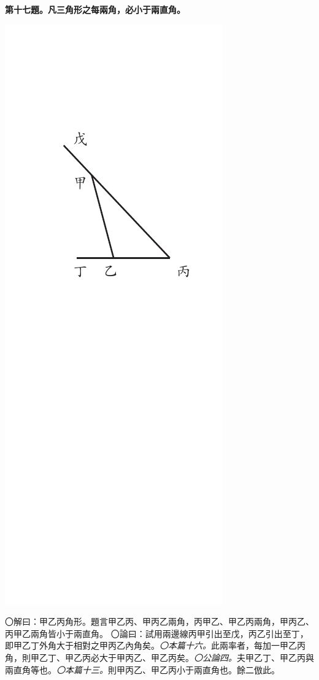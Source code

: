 \documentclass[12pt,b5paper,landscape]{article}
\newcommand{\ccom}[1]{{\footnotesize \emph{〇#1}}}
\newcommand{\bcom}[1]{〇#1}
\newcommand{\cthm}[1]{{
\vspace{8pt}

\bfseries #1}}
\begin{document}
\begin{multicols}{2}
\cthm{第十七題。凡三角形之每兩角，必小于兩直角。}
\begin{center}
  \includegraphics[angle=90]{eu62}  
\end{center}
\bcom{解曰：甲乙丙角形。題言甲乙丙、甲丙乙兩角，丙甲乙、甲乙丙兩角，甲丙乙、丙甲乙兩角皆小于兩直角。}
\bcom{論曰：試用兩邊線丙甲引出至戊，丙乙引出至丁，即甲乙丁外角大于相對之甲丙乙內角矣。\ccom{本篇十六。}此兩率者，每加一甲乙丙角，則甲乙丁、甲乙丙必大于甲丙乙、甲乙丙矣。\ccom{公論四。}夫甲乙丁、甲乙丙與兩直角等也。\ccom{本篇十三。}則甲丙乙、甲乙丙小于兩直角也。餘二倣此。}


\end{multicols}
\end{document}
